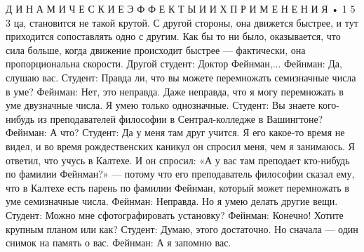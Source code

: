 \documentclass[10pt,oneside]{article}
\begin{document}
Д И Н А М И Ч Е С К И Е  Э Ф Ф Е К Т Ы  И  И Х  П Р И М Е Н Е Н И Я • 1 5 3 ца, становится не такой крутой. С другой стороны, она движется быстрее, и тут приходится сопоставлять одно с другим. Как бы то ни было, оказывается, что сила больше, когда движение происходит быстрее --- фактически, она пропорциональна скорости. Другой студент: Доктор Фейнман,... Фейнман: Да, слушаю вас. Студент: Правда ли, что вы можете перемножать семизначные числа в уме? Фейнман: Нет, это неправда. Даже неправда, что я могу перемножать в уме двузначные числа. Я умею только однозначные. Студент: Вы знаете кого-нибудь из преподавателей философии в Сентрал-колледже в Вашингтоне? Фейнман: А что? Студент: Да у меня там друг учится. Я его какое-то время не видел, и во время рождественских каникул он спросил меня, чем я занимаюсь. Я ответил, что учусь в Калтехе. И он спросил: «А у вас там преподает кто-нибудь по фамилии Фейнман?» --- потому что его преподаватель философии сказал ему, что в Калтехе есть парень по фамилии Фейнман, который может перемножать в уме семизначные числа. Фейнман: Неправда. Но я умею делать другие вещи. Студент: Можно мне сфотографировать установку? Фейнман: Конечно! Хотите крупным планом или как? Студент: Думаю, этого достаточно. Но сначала --- один снимок на память о вас. Фейнман: А я запомню вас.\par

\clearpage
{}
\end{document}
